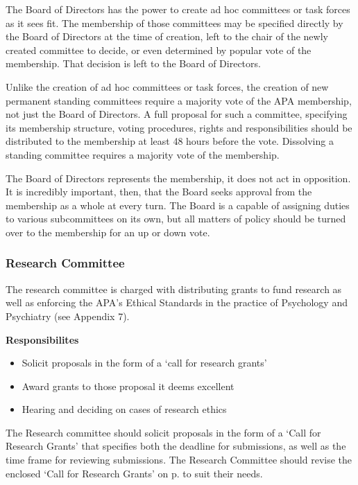The Board of Directors has the power to create ad hoc committees or task forces as it sees fit. The membership of those committees may be specified directly by the Board of Directors at the time of creation, left to the chair of the newly created committee to decide, or even determined by popular vote of the membership. That decision is left to the Board of Directors.

Unlike the creation of ad hoc committees or task forces, the creation of new permanent standing committees require a majority vote of the APA membership, not just the Board of Directors. A full proposal for such a committee, specifying its membership structure, voting procedures, rights and responsibilities should be distributed to the membership at least 48 hours before the vote. Dissolving a standing committee requires a majority vote of the membership.

The Board of Directors represents the membership, it does not act in opposition. It is incredibly important, then, that the Board seeks approval from the membership as a whole at every turn. The Board is a capable of assigning duties to various subcommittees on its own, but all matters of policy should be turned over to the membership for an up or down vote.

\subsubsection{Research Committee}
\label{researchcommittee}

The research committee is charged with distributing grants to fund research as well as enforcing the APA's Ethical Standards in the practice of Psychology and Psychiatry (see Appendix 7). 

\textbf{Responsibilites}

\begin{itemize}
\item Solicit proposals in the form of a `call for research grants'

\item Award grants to those proposal it deems excellent

\item Hearing and deciding on cases of research ethics

\end{itemize}

The Research committee should solicit proposals in the form of a `Call for Research Grants' that specifies both the deadline for submissions, as well as the time frame for reviewing submissions. The Research Committee should revise the enclosed `Call for Research Grants' on p. \pageref{callforresearchgrants} to suit their needs.


